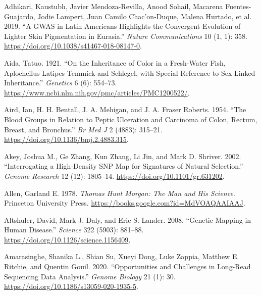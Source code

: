 \documentclass[
]{book}
\newlength{\cslhangindent}
\newlength{\cslentryspacingunit} %
\newenvironment{CSLReferences}[2] %
 {%
  \setlength{\parindent}{0pt}
  \ifodd #1
  \let\oldpar\par
  \def\par{\hangindent=\cslhangindent\oldpar}
  \fi
  \setlength{\parskip}{#2\cslentryspacingunit}
 }%
 {}
\begin{document}
\hypertarget{refs}{}
\begin{CSLReferences}{1}{0}
\leavevmode{}%
Adhikari, Kaustubh, Javier Mendoza-Revilla, Anood Sohail, Macarena Fuentes-Guajardo, Jodie Lampert, Juan Camilo Chac'on-Duque, Malena Hurtado, et al. 2019. {``A {GWAS} in {Latin Americans} Highlights the Convergent Evolution of Lighter Skin Pigmentation in {Eurasia}.''} \emph{Nature Communications} 10 (1, 1): 358. \url{https://doi.org/10.1038/s41467-018-08147-0}.

\leavevmode{}%
Aida, Tatuo. 1921. {``On the {Inheritance} of {Color} in a {Fresh-Water Fish}, {Aplocheilus Latipes Temmick} and {Schlegel}, with {Special Reference} to {Sex-Linked Inheritance}.''} \emph{Genetics} 6 (6): 554--73. \url{https://www.ncbi.nlm.nih.gov/pmc/articles/PMC1200522/}.

\leavevmode{}%
Aird, Ian, H. H. Bentall, J. A. Mehigan, and J. A. Fraser Roberts. 1954. {``The {Blood Groups} in {Relation} to {Peptic Ulceration} and {Carcinoma} of {Colon}, {Rectum}, {Breast}, and {Bronchus}.''} \emph{Br Med J} 2 (4883): 315--21. \url{https://doi.org/10.1136/bmj.2.4883.315}.

\leavevmode{}%
Akey, Joshua M., Ge Zhang, Kun Zhang, Li Jin, and Mark D. Shriver. 2002. {``Interrogating a {High-Density SNP Map} for {Signatures} of {Natural Selection}.''} \emph{Genome Research} 12 (12): 1805--14. \url{https://doi.org/10.1101/gr.631202}.

\leavevmode{}%
Allen, Garland E. 1978. \emph{Thomas {Hunt Morgan}: {The Man} and {His Science}}. {Princeton University Press}. \url{https://books.google.com?id=MdVOAQAAIAAJ}.

\leavevmode{}%
Altshuler, David, Mark J. Daly, and Eric S. Lander. 2008. {``Genetic {Mapping} in {Human Disease}.''} \emph{Science} 322 (5903): 881--88. \url{https://doi.org/10.1126/science.1156409}.

\leavevmode{}%
Amarasinghe, Shanika L., Shian Su, Xueyi Dong, Luke Zappia, Matthew E. Ritchie, and Quentin Gouil. 2020. {``Opportunities and Challenges in Long-Read Sequencing Data Analysis.''} \emph{Genome Biology} 21 (1): 30. \url{https://doi.org/10.1186/s13059-020-1935-5}.


\end{CSLReferences}
\end{document}
